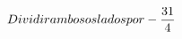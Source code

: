 \documentclass[preview]{standalone}
\begin{document}
\begin{align*}
\special{dvisvgm:raw <g id='unique000'>}Dividir ambos os lados por - \frac{31}{4}\special{dvisvgm:raw </g>}
\end{align*}
\end{document}
